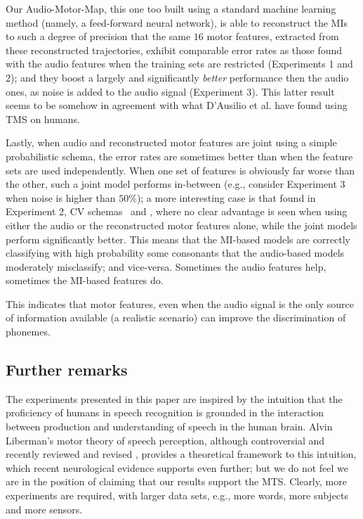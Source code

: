 Our Audio-Motor-Map, this one too built using a standard machine learning
method (namely, a feed-forward neural network), is able to reconstruct the MIs
to such a degree of precision that the same $16$ motor features, extracted from these
reconstructed trajectories, exhibit comparable error rates as those found with the
audio features when the training sets are restricted (Experiments 1 and 2); and they
boost a largely and significantly \emph{better} performance then the audio ones, as
noise is added to the audio signal (Experiment 3). This latter result seems to be
somehow in agreement with what D'Ausilio et al. have found using TMS on humans.

Lastly, when audio and reconstructed motor features are joint using a simple
probabilistic schema, the error rates are sometimes better than when
the feature sets are used independently. When one set of features is obviously
far worse than the other, such a joint model performs in-between (e.g., consider
Experiment 3 when noise is higher than $50\%$); a more interesting case is that
found in Experiment 2, CV schemas \spkb\ and \spkc, where no clear advantage is seen
when using either the audio or the reconstructed motor features alone, while
the joint models perform significantly better. This means that the MI-based models are
correctly classifying with high probability some consonants that the audio-based models
moderately misclassify; and vice-versa. Sometimes the audio features help, sometimes the
MI-based features do.

This indicates that motor features, even when the audio signal is the only source of
information available (a realistic scenario) can improve the discrimination of phonemes.

\subsection{Further remarks}

The experiments presented in this paper are inspired by the intuition that the
proficiency of humans in speech recognition is grounded in the interaction
between production and understanding of speech in the human brain. Alvin
Liberman's motor theory of speech perception, although controversial and
recently reviewed and revised \cite{liberman1,liberman2,galant,massaro},
provides a theoretical framework to this intuition, which recent neurological
evidence \cite{dausilio} supports even further; but we do not feel we are in
the position of claiming that our results support the MTS. Clearly, more
experiments are required, with larger data sets, e.g., more words, more subjects
and more sensors.

